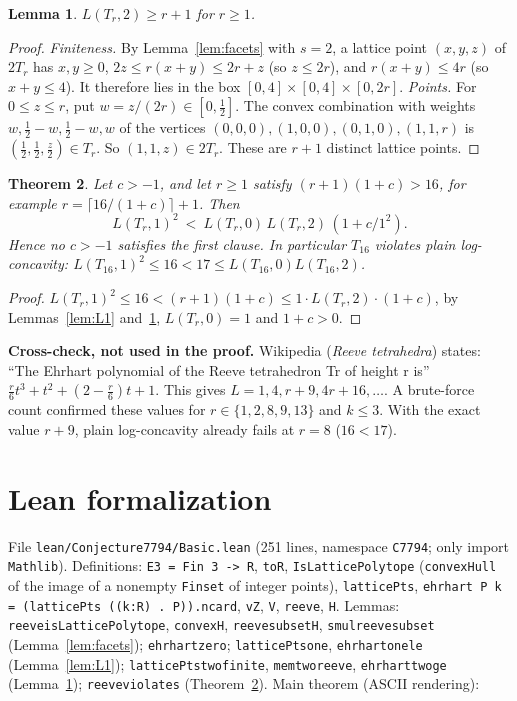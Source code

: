 \documentclass[11pt]{article}
\renewcommand{\_}{\oldus\allowbreak}
\newtheorem{theorem}{Theorem}
\newtheorem{lemma}[theorem]{Lemma}
\theoremstyle{definition}
\begin{document}
\begin{lemma}\label{lem:L2}
$L(T_r, 2) \ge r + 1$ for $r \ge 1$.
\end{lemma}
\begin{proof}
\emph{Finiteness.} By Lemma~\ref{lem:facets} with $s = 2$, a lattice point $(x,y,z)$ of $2T_r$ has $x, y
\ge 0$, $2z \le r(x+y) \le 2r + z$ (so $z \le 2r$), and $r(x+y) \le 4r$ (so $x + y \le 4$). It therefore
lies in the box $[0,4] \times [0,4] \times [0,2r]$.
\emph{Points.} For $0 \le z \le r$, put $w = z/(2r) \in [0, \tfrac12]$. The convex combination with
weights $w, \tfrac12 - w, \tfrac12 - w, w$ of the vertices $(0,0,0), (1,0,0), (0,1,0), (1,1,r)$ is
$(\tfrac12, \tfrac12, \tfrac z2) \in T_r$. So $(1,1,z) \in 2T_r$. These are $r + 1$ distinct lattice points.
\end{proof}

\begin{theorem}\label{thm:main}
Let $c > -1$, and let $r \ge 1$ satisfy $(r+1)(1+c) > 16$, for example $r = \lceil 16/(1+c) \rceil +
1$. Then
\[ L(T_r,1)^2 \ <\ L(T_r,0)\, L(T_r,2)\, (1 + c/1^2). \]
Hence no $c > -1$ satisfies the first clause. In particular $T_{16}$ violates plain log-concavity:
$L(T_{16},1)^2 \le 16 < 17 \le L(T_{16},0) L(T_{16},2)$.
\end{theorem}
\begin{proof}
$L(T_r,1)^2 \le 16 < (r+1)(1+c) \le 1 \cdot L(T_r,2) \cdot (1+c)$, by Lemmas~\ref{lem:L1} and~\ref{lem:L2},
$L(T_r,0) = 1$ and $1 + c > 0$.
\end{proof}

\noindent\textbf{Cross-check, not used in the proof.} Wikipedia (\emph{Reeve tetrahedra}) states:
``The Ehrhart polynomial of the Reeve tetrahedron Tr of height r is'' $\frac r6 t^3 + t^2 + (2 - \frac r6)t
+ 1$. This gives $L = 1, 4, r+9, 4r+16, \dots$. A brute-force count confirmed these values for $r \in
\{1,2,8,9,13\}$ and $k \le 3$. With the exact value $r + 9$, plain log-concavity already fails at $r =
8$ ($16 < 17$).

\section{Lean formalization}\label{sec:lean}

File \texttt{lean/Conjecture7794/Basic.lean} (251 lines, namespace \texttt{C7794}; only import
\texttt{Mathlib}). Definitions: \texttt{E3 = Fin 3 -> R}, \texttt{toR}, \texttt{IsLatticePolytope}
(\texttt{convexHull} of the image of a nonempty \texttt{Finset} of integer points),
\texttt{latticePts}, \texttt{ehrhart P k = (latticePts ((k:R) . P)).ncard}, \texttt{vZ}, \texttt{V},
\texttt{reeve}, \texttt{H}. Lemmas: \texttt{reeve\_isLatticePolytope}, \texttt{convex\_H},
\texttt{reeve\_subset\_H}, \texttt{smul\_reeve\_subset} (Lemma~\ref{lem:facets}); \texttt{ehrhart\_zero};
\texttt{latticePts\_one}, \texttt{ehrhart\_one\_le} (Lemma~\ref{lem:L1}); \texttt{latticePts\_two\_finite},
\texttt{mem\_two\_reeve}, \texttt{ehrhart\_two\_ge} (Lemma~\ref{lem:L2}); \texttt{reeve\_violates}
(Theorem~\ref{thm:main}). Main theorem (ASCII rendering):
\end{document}
